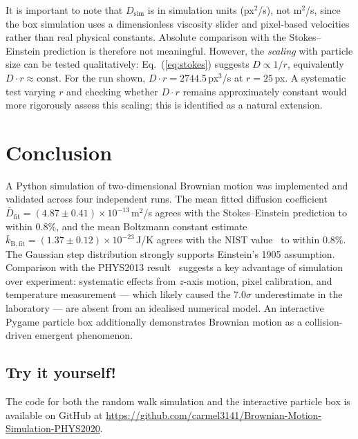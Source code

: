\documentclass[prb,twocolumn]{revtex4-1}
\begin{document}
It is important to note that $D_{\mathrm{sim}}$ is in simulation units (px$^2$/s), not m$^2$/s, since the box simulation uses a dimensionless viscosity slider and pixel-based velocities rather than real physical constants. Absolute comparison with the Stokes--Einstein prediction is therefore not meaningful. However, the \textit{scaling} with particle size can be tested qualitatively: Eq.~(\ref{eq:stokes}) suggests $D \propto 1/r$, equivalently $D\cdot r \approx \mathrm{const}$. For the run shown, $D\cdot r = 2744.5$\,px$^3$/s at $r = 25$\,px. A systematic test varying $r$ and checking whether $D\cdot r$ remains approximately constant would more rigorously assess this scaling; this is identified as a natural extension.

\section{Conclusion}

A Python simulation of two-dimensional Brownian motion was implemented and validated across four independent runs. The mean fitted diffusion coefficient $\bar{D}_{\mathrm{fit}} = (4.87\pm0.41)\times10^{-13}$\,m$^2$/s agrees with the Stokes--Einstein prediction to within $0.8\%$, and the mean Boltzmann constant estimate $\bar{k}_{\mathrm{B,fit}} = (1.37\pm0.12)\times10^{-23}$\,J/K agrees with the NIST value~\cite{nist} to within $0.8\%$. The Gaussian step distribution strongly supports Einstein's 1905 assumption. Comparison with the PHYS2013 result~\cite{lukacs2026lab} suggests a key advantage of simulation over experiment: systematic effects from $z$-axis motion, pixel calibration, and temperature measurement --- which likely caused the $7.0\sigma$ underestimate in the laboratory --- are absent from an idealised numerical model. An interactive Pygame particle box additionally demonstrates Brownian motion as a collision-driven emergent phenomenon.

\subsection{Try it yourself!}
The code for both the random walk simulation and the interactive particle box is available on GitHub at \url{https://github.com/carmel3141/Brownian-Motion-Simulation-PHYS2020}. 
\end{document}
